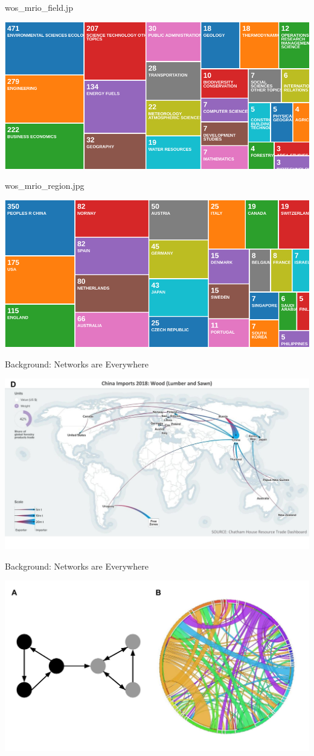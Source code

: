 \documentclass[ignorenonframetext,]{beamer}
\begin{document}
\begin{frame}{wos\_mrio\_field.jp}

\begin{center}\includegraphics[width=0.5\linewidth]{images/wos_mrio_field} \end{center}

\end{frame}

\begin{frame}{wos\_mrio\_region.jpg}

\begin{center}\includegraphics[width=0.5\linewidth]{images/wos_mrio_region} \end{center}

\end{frame}

\begin{frame}{Background: Networks are Everywhere}

\begin{center}\includegraphics[width=0.5\linewidth]{images/resourcetrade_network} \end{center}

\end{frame}

\begin{frame}{Background: Networks are Everywhere}

\begin{center}\includegraphics[width=0.5\linewidth]{images/example_network} \end{center}

\end{frame}
\end{document}
